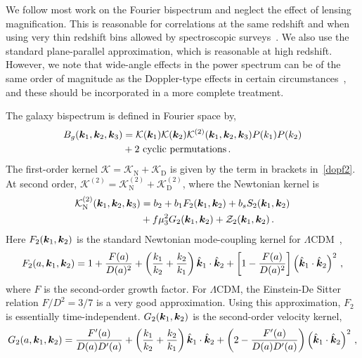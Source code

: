 We follow most work on the Fourier bispectrum and neglect the effect of lensing magnification. This is reasonable for correlations at the same redshift and when using very thin redshift bins allowed by spectroscopic surveys~\citep{DiDio:2018unb}. We also use the standard plane-parallel approximation, which is reasonable at high redshift. However, we note that wide-angle effects in the power spectrum can be of the same order of magnitude as the Doppler-type effects in certain circumstances~\citep{Tansella:2017rpi}, and these should be incorporated in a more complete treatment.

The galaxy bispectrum is defined in Fourier space by,
\begin{align}
B_{g}( \bm{k}_{1},  \bm{k}_{2},  \bm {k}_3) &= { \mathcal{K}( \bm {k}_{1})\mathcal{K}({\bm {k}}_{2}) \mathcal{K}^{(2)}(  \bm{k}_{1},  \bm{k}_{2}, \bm {k}_3)}
P(k_{1})P(k_{2}) \nonumber\\ 
&+\text{2 cyclic permutations}\,.\label{eq:fsbispdef}
\end{align}
The first-order kernel $\mathcal{K}=\mathcal{K}_{\mathrm{N}}+\mathcal{K}_{\mathrm{D}}$ is given by the term in brackets in~\eqref{dopf2}.
At second order, $\mathcal{K}^{(2)}=\mathcal{K}_{\mathrm{N}}^{(2)}+\mathcal{K}_{\mathrm{D}}^{(2)}$, where
 the Newtonian kernel is~\citep{Verde:1998zr}
\begin{align}
\mathcal{K}_{\mathrm{N}}^{(2)} (\bm {k}_1,\bm {k}_2,\bm {k}_3) &= b_{2} + b_{1}F_{2}(\bm {k}_1,\bm {k}_2) + b_s S_{2}(\bm {k}_1,\bm {k}_2) \nonumber \\
& + f \mu_3^{2} G_{2}(\bm {k}_1,\bm {k}_2)
+ {\cal Z}_2(\bm {k}_1,\bm {k}_2)\,.   \label{kn2}  
\end{align}
Here $F_2(\bm {k}_1,\bm {k}_2)$ is the standard Newtonian mode-coupling kernel for $\Lambda$CDM~\citep{Villa:2015ppa}, 
\begin{equation}
    F_2(a,\bm {k}_1,\bm {k}_2) = 1 + \frac{F(a)}{D(a)^2} + \left( \frac{k_1}{k_2} + \frac{k_2}{k_1} \right) \hat{\bm {k}}_1 \cdot \hat{\bm {k}}_2 + \left[ 1 - \frac{F(a)}{D(a)^2} \right]\left( \hat{\bm {k}}_1 \cdot \hat{\bm {k}}_2 \right)^2\,,
\end{equation}
where $F$ is the second-order growth factor. For $\Lambda$CDM, the Einstein-De Sitter relation $F/D^2 = 3/7$ is a very good approximation. Using this approximation, $F_2$ is essentially time-independent. $G_2({\bm {k}_{1}},  {\bm {k}_{2}})$ is the second-order velocity kernel, 
\begin{equation}
    G_2(a,\bm {k}_1,\bm {k}_2) = \frac{F'(a)}{D(a) D'(a)} + \left( \frac{k_1}{k_2} + \frac{k_2}{k_1} \right) \hat{\bm {k}}_1 \cdot \hat{\bm {k}}_2 + \left( 2 - \frac{F'(a)}{D(a) D'(a)} \right) \left( \hat{\bm {k}}_1 \cdot \hat{\bm {k}}_2 \right)^2\,,
\end{equation}
